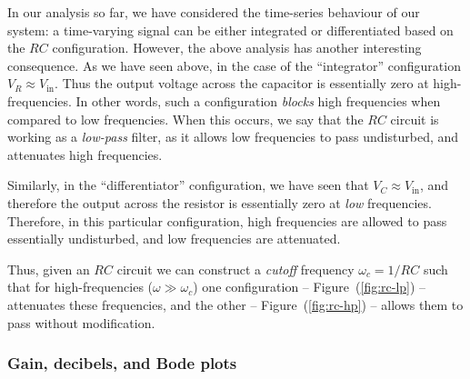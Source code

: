 In our analysis so far, we have considered the time-series behaviour of our system: a time-varying signal can be either integrated or differentiated based on the $RC$ configuration. However, the above analysis has another interesting consequence. As we have seen above, in the case of the ``integrator'' configuration $V_R \approx V_\text{in}$. Thus the output voltage across the capacitor is essentially zero at high-frequencies. In other words, such a configuration \textsl{blocks} high frequencies when compared to low frequencies. When this occurs, we say that the $RC$ circuit is working as a \textsl{low-pass} filter, as it allows low frequencies to pass undisturbed, and attenuates high frequencies.

Similarly, in the ``differentiator'' configuration, we have seen that $V_C \approx V_\text{in}$, and therefore the output across the resistor is essentially zero at \textsl{low} frequencies. Therefore, in this particular configuration, high frequencies are allowed to pass essentially undisturbed, and low frequencies are attenuated.

Thus, given an $RC$ circuit we can construct a \textsl{cutoff} frequency $\omega_c = 1/RC$ such that for high-frequencies ($\omega \gg \omega_c$) one configuration -- Figure~(\ref{fig:rc-lp}) -- attenuates these frequencies, and the other -- Figure~(\ref{fig:rc-hp}) -- allows them to pass without modification.

\subsubsection*{Gain, decibels, and Bode plots}

